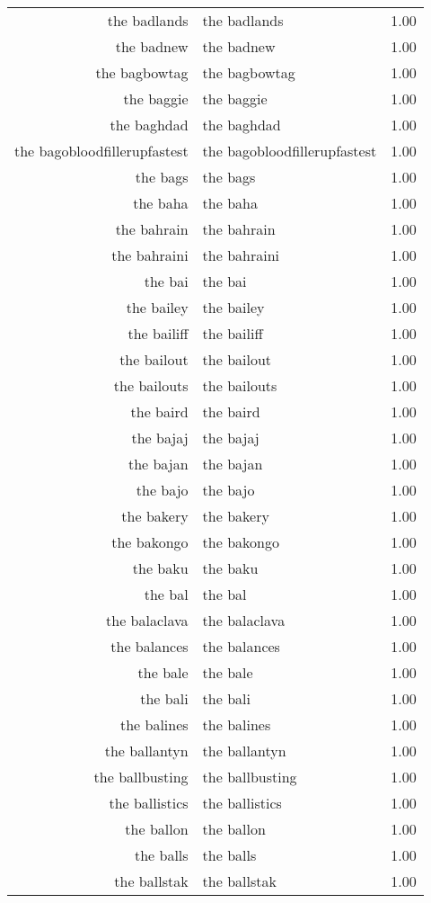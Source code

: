 \begin{table}[ht]
\begin{tabular}{rlr}
  the badlands & the badlands & 1.00 \\ 
  the badnew & the badnew & 1.00 \\ 
  the bagbowtag & the bagbowtag & 1.00 \\ 
  the baggie & the baggie & 1.00 \\ 
  the baghdad & the baghdad & 1.00 \\ 
  the bagobloodfillerupfastest & the bagobloodfillerupfastest & 1.00 \\ 
  the bags & the bags & 1.00 \\ 
  the baha & the baha & 1.00 \\ 
  the bahrain & the bahrain & 1.00 \\ 
  the bahraini & the bahraini & 1.00 \\ 
  the bai & the bai & 1.00 \\ 
  the bailey & the bailey & 1.00 \\ 
  the bailiff & the bailiff & 1.00 \\ 
  the bailout & the bailout & 1.00 \\ 
  the bailouts & the bailouts & 1.00 \\ 
  the baird & the baird & 1.00 \\ 
  the bajaj & the bajaj & 1.00 \\ 
  the bajan & the bajan & 1.00 \\ 
  the bajo & the bajo & 1.00 \\ 
  the bakery & the bakery & 1.00 \\ 
  the bakongo & the bakongo & 1.00 \\ 
  the baku & the baku & 1.00 \\ 
  the bal & the bal & 1.00 \\ 
  the balaclava & the balaclava & 1.00 \\ 
  the balances & the balances & 1.00 \\ 
  the bale & the bale & 1.00 \\ 
  the bali & the bali & 1.00 \\ 
  the balines & the balines & 1.00 \\ 
  the ballantyn & the ballantyn & 1.00 \\ 
  the ballbusting & the ballbusting & 1.00 \\ 
  the ballistics & the ballistics & 1.00 \\ 
  the ballon & the ballon & 1.00 \\ 
  the balls & the balls & 1.00 \\ 
  the ballstak & the ballstak & 1.00 \\ 

\end{tabular}
\end{table}
